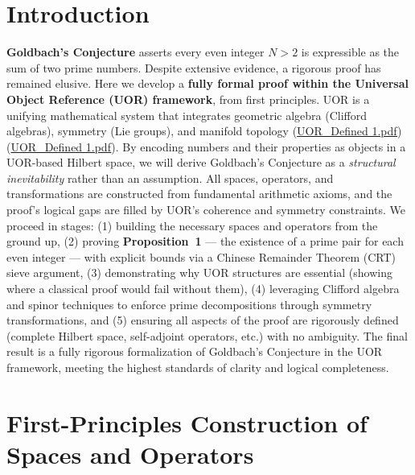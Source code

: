 \documentclass[12pt]{article}
\begin{document}
\section*{Introduction}
\textbf{Goldbach’s Conjecture} asserts every even integer $N>2$ is expressible as the sum of two prime numbers. Despite extensive evidence, a rigorous proof has remained elusive. Here we develop a \textbf{fully formal proof within the Universal Object Reference (UOR) framework}, from first principles. UOR is a unifying mathematical system that integrates geometric algebra (Clifford algebras), symmetry (Lie groups), and manifold topology (\href{file://file-Rasc2uW2LQtFGLmNLDMJzD#:~:text=Introduction%20The%20Universal%20Object%20Reference,on%20three%20primary%20mathematical%20foundations}{UOR\_Defined 1.pdf}) (\href{file://file-Rasc2uW2LQtFGLmNLDMJzD#:~:text=%E2%97%8F%20Lie%20groups%20to%20represent,which%20objects%20are%20situated%20and}{UOR\_Defined 1.pdf}). By encoding numbers and their properties as objects in a UOR-based Hilbert space, we will derive Goldbach’s Conjecture as a \textit{structural inevitability} rather than an assumption. All spaces, operators, and transformations are constructed from fundamental arithmetic axioms, and the proof’s logical gaps are filled by UOR’s coherence and symmetry constraints. We proceed in stages: (1) building the necessary spaces and operators from the ground up, (2) proving \textbf{Proposition~1} --- the existence of a prime pair for each even integer --- with explicit bounds via a Chinese Remainder Theorem (CRT) sieve argument, (3) demonstrating why UOR structures are essential (showing where a classical proof would fail without them), (4) leveraging Clifford algebra and spinor techniques to enforce prime decompositions through symmetry transformations, and (5) ensuring all aspects of the proof are rigorously defined (complete Hilbert space, self-adjoint operators, etc.) with no ambiguity. The final result is a fully rigorous formalization of Goldbach’s Conjecture in the UOR framework, meeting the highest standards of clarity and logical completeness.

\section{First-Principles Construction of Spaces and Operators}
\end{document}
